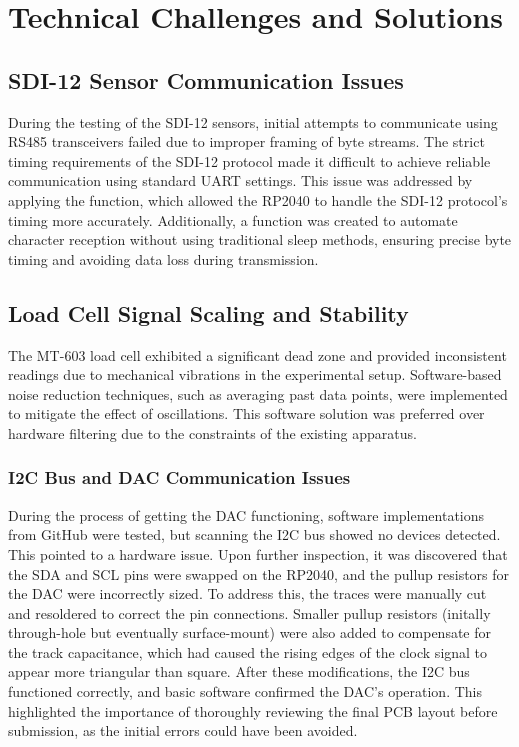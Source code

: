 \section{Technical Challenges and Solutions}

\subsection{SDI-12 Sensor Communication Issues}
During the testing of the SDI-12 sensors, initial attempts to communicate using RS485 transceivers failed due to improper framing of byte streams. The strict timing requirements of the SDI-12 protocol made it difficult to achieve reliable communication using standard UART settings. This issue was addressed by applying the  function, which allowed the RP2040 to handle the SDI-12 protocol's timing more accurately. Additionally, a  function was created to automate character reception without using traditional sleep methods, ensuring precise byte timing and avoiding data loss during transmission.

\subsection{Load Cell Signal Scaling and Stability}
The MT-603 load cell exhibited a significant dead zone and provided inconsistent readings due to mechanical vibrations in the experimental setup. Software-based noise reduction techniques, such as averaging past data points, were implemented to mitigate the effect of oscillations. This software solution was preferred over hardware filtering due to the constraints of the existing apparatus.

\subsubsection{I2C Bus and DAC Communication Issues}
During the process of getting the DAC functioning, software implementations from GitHub were tested, but scanning the I2C bus showed no devices detected. This pointed to a hardware issue. Upon further inspection, it was discovered that the SDA and SCL pins were swapped on the RP2040, and the pullup resistors for the DAC were incorrectly sized. To address this, the traces were manually cut and resoldered to correct the pin connections. Smaller pullup resistors (initally through-hole but eventually surface-mount) were also added to compensate for the track capacitance, which had caused the rising edges of the clock signal to appear more triangular than square. After these modifications, the I2C bus functioned correctly, and basic software confirmed the DAC's operation. This highlighted the importance of thoroughly reviewing the final PCB layout before submission, as the initial errors could have been avoided.